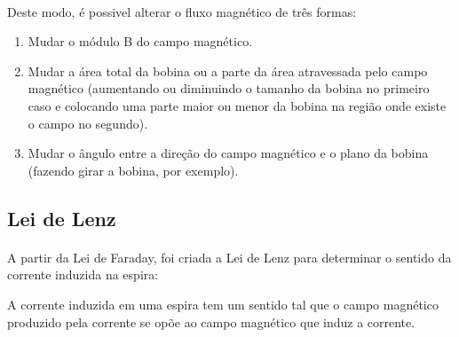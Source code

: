 \documentclass[a4paper, 12pt]{article}
\begin{document}
\paragraph{}Deste modo, é possivel alterar o fluxo magnético de três formas:
\begin{enumerate}
    \item Mudar o módulo B do campo magnético.
    \item Mudar a área total da bobina ou a parte da área atravessada pelo campo magnético (aumentando ou diminuindo o tamanho da bobina no primeiro caso e colocando uma parte maior ou menor da bobina na região onde existe o campo no segundo).

    \item Mudar o ângulo entre a direção do campo magnético e o plano da bobina (fazendo girar a bobina, por exemplo).

\end{enumerate}

    \subsection{Lei de Lenz}
\paragraph{}A partir da Lei de Faraday, foi criada a Lei de Lenz para determinar o sentido da corrente induzida na espira:
\\
\begin{mdframed}[backgroundcolor=gray!20]
	\begin{center}
		A corrente induzida em uma espira tem um sentido tal que o campo magnético produzido pela corrente se opõe ao campo magnético que induz a corrente.
		\end{center}
\end{mdframed}
\end{document}
